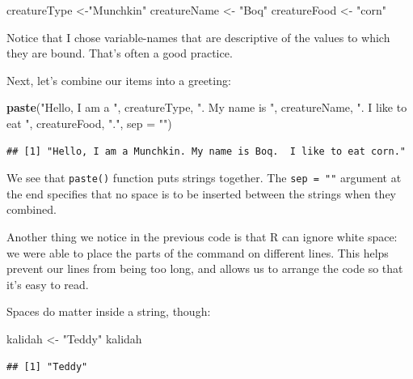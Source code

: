 \documentclass[]{book}
\makeatletter
\newenvironment{Shaded}{\begin{snugshade}}{\end{snugshade}}
\newcommand{\KeywordTok}[1]{\textcolor[rgb]{0.13,0.29,0.53}{\textbf{#1}}}
\newcommand{\DataTypeTok}[1]{\textcolor[rgb]{0.13,0.29,0.53}{#1}}
\newcommand{\StringTok}[1]{\textcolor[rgb]{0.31,0.60,0.02}{#1}}
\newcommand{\NormalTok}[1]{#1}
\newenvironment{kframe}{%
\medskip{}
\setlength{\fboxsep}{.8em}
 \def\at@end@of@kframe{}%
 \ifinner\ifhmode%
  \def\at@end@of@kframe{\end{minipage}}%
  \begin{minipage}{\columnwidth}%
 \fi\fi%
 \def\FrameCommand##1{\hskip\@totalleftmargin \hskip-\fboxsep
 \colorbox{shadecolor}{##1}\hskip-\fboxsep
     \hskip-\linewidth \hskip-\@totalleftmargin \hskip\columnwidth}%
 \MakeFramed {\advance\hsize-\width
   \@totalleftmargin\z@ \linewidth\hsize
   \@setminipage}}%
 {\par\unskip\endMakeFramed%
 \at@end@of@kframe}
\renewenvironment{Shaded}{\begin{kframe}}{\end{kframe}}
\theoremstyle{definition}
\theoremstyle{definition}
\theoremstyle{definition}
\theoremstyle{remark}
\makeatother
\begin{document}
\begin{Shaded}
\begin{Highlighting}[]
\NormalTok{creatureType <-}\StringTok{"Munchkin"}
\NormalTok{creatureName <-}\StringTok{ "Boq"}
\NormalTok{creatureFood <-}\StringTok{ "corn"}
\end{Highlighting}
\end{Shaded}

Notice that I chose variable-names that are descriptive of the values to
which they are bound. That's often a good practice.

Next, let's combine our items into a greeting:

\begin{Shaded}
\begin{Highlighting}[]
\KeywordTok{paste}\NormalTok{(}\StringTok{"Hello, I am a "}\NormalTok{,}
\NormalTok{      creatureType,}
      \StringTok{". My name is "}\NormalTok{,}
\NormalTok{      creatureName,}
      \StringTok{".  I like to eat "}\NormalTok{,}
\NormalTok{      creatureFood,}
      \StringTok{"."}\NormalTok{,}
      \DataTypeTok{sep =} \StringTok{""}\NormalTok{)}
\end{Highlighting}
\end{Shaded}

\begin{verbatim}
## [1] "Hello, I am a Munchkin. My name is Boq.  I like to eat corn."
\end{verbatim}

We see that \texttt{paste()}
function puts strings
together. The \texttt{sep\ =\ ""} argument at the end specifies that no
space is to be inserted between the strings when they combined.

Another thing we notice in the previous code is that R can ignore white
space: we were able to place the parts of the command on different
lines. This helps prevent our lines from being too long, and allows us
to arrange the code so that it's easy to read.

Spaces do matter inside a string, though:

\begin{Shaded}
\begin{Highlighting}[]
\NormalTok{kalidah <-}\StringTok{ "Teddy"}
\NormalTok{kalidah}
\end{Highlighting}
\end{Shaded}

\begin{verbatim}
## [1] "Teddy"
\end{verbatim}
\end{document}
